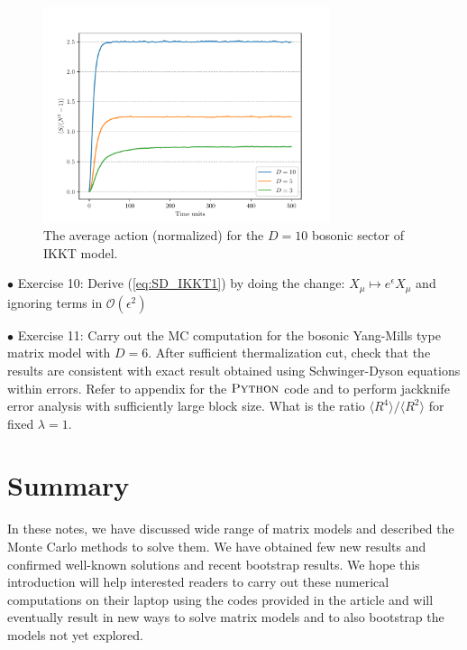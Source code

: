 \documentclass[11pt]{article}
\begin{document}
\begin{figure}[htbp] 
	\centering 
	\includegraphics[width=0.75\textwidth]{figs/act_allD_YM.pdf}
	\caption{\label{fig:IKKT_2}The average action (normalized) for the $D=10$ bosonic sector of IKKT model.}
\end{figure}


\begin{mdframed}[backgroundcolor=blue!3] 
	\textsc{} 
	$\bullet$ Exercise 10: Derive (\ref{eq:SD_IKKT1}) by doing the change: $X_{\mu} \mapsto e^{\epsilon}X_{\mu}$ and ignoring terms in 
	$\mathcal{O}(\epsilon^{2})$
\end{mdframed}

\vspace{10mm} 

\begin{mdframed}[backgroundcolor=blue!3] 
	\textsc{} 
	$\bullet$ Exercise 11: Carry out the MC computation for the bosonic Yang-Mills type matrix model with $D=6$. After sufficient thermalization cut, check that the results are consistent with exact result obtained using Schwinger-Dyson equations within errors. Refer to appendix for the $\textsc{Python}$ code and to perform jackknife error analysis with sufficiently large block size. What is the ratio $\langle R^4 \rangle / \langle R^2 \rangle$ for fixed $\lambda=1$. 
\end{mdframed} 

\section{Summary}

In these notes, we have discussed wide range of matrix models and 
described the Monte Carlo methods to solve them. We have obtained few new 
results and confirmed well-known solutions and recent bootstrap results.
We hope this introduction will help interested readers 
to carry out these numerical computations 
on their laptop using the codes provided in the article 
and will eventually result in new ways 
to solve matrix models and to also 
bootstrap the models not yet explored. 
\end{document}

